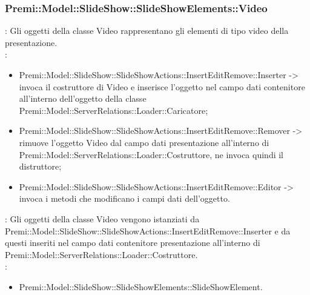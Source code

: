 {                    \subsubsection{Premi::Model::SlideShow::SlideShowElements::Video}{
				\textbf{\tipo}: Gli oggetti della classe Video rappresentano gli elementi di tipo video della presentazione.\\
				\textbf{\relaz}: 
				\begin{itemize}
					\item Premi::Model::SlideShow::SlideShowActions::InsertEditRemove::Inserter -> invoca il costruttore di Video e inserisce l’oggetto nel campo dati contenitore all’interno dell’oggetto della classe Premi::Model::ServerRelations::Loader::Caricatore;
                    \item Premi::Model::SlideShow::SlideShowActions::InsertEditRemove::Remover -> rimuove l’oggetto Video dal campo dati presentazione all’interno di Premi::Model::ServerRelations::Loader::Costruttore, ne invoca quindi il distruttore;
                     \item Premi::Model::SlideShow::SlideShowActions::InsertEditRemove::Editor -> invoca i metodi che modificano i campi dati dell'oggetto.
				\end{itemize}	
                \textbf{\interfacce}: Gli oggetti della classe Video vengono istanziati da Premi::Model::SlideShow::SlideShowActions::InsertEditRemove::Inserter e da questi inseriti nel campo dati contenitore presentazione all’interno di Premi::Model::ServerRelations::Loader::Costruttore.\\
                \textbf{\base}: 
                    \begin{itemize}
                    \item Premi::Model::SlideShow::SlideShowElements::SlideShowElement.
                    \end{itemize}
                    }     
}
